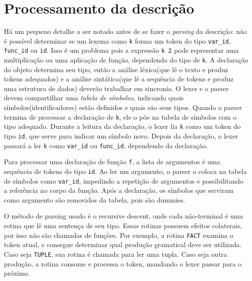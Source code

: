 \documentclass[10pt,a4paper,final]{article}
\begin{document}
\section{Processamento da descrição}
Há um pequeno detalhe a ser notado antes de se fazer o \textit{parsing} da descrição: não é possível determinar se um lexema como \texttt{k} forma um token do tipo \texttt{var\_id}, \texttt{func\_id} ou \texttt{id}. Isso é um problema pois a expressão \texttt{k 2} pode representar uma multiplicação ou uma aplicação de função, dependendo do tipo de \texttt{k}. A declaração do objeto determina seu tipo, então a análise léxica(que lê o texto e produz tokens adequados) e a análise sintática(que lê a sequência de tokens e produz uma estrutura de dados) deverão trabalhar em sincronia. O lexer e o parser devem compartilhar uma \textit{tabela de símbolos}, indicando quais símbolos(identificadores) estão definidos e quais são seus tipos. Quando o parser termina de processar a declaração de \texttt{k}, ele o põe na tabela de símbolos com o tipo adequado. Durante a leitura da declaração, o lexer lia \texttt{k} como um token do tipo \texttt{id}, que serve para indicar um símbolo novo. Depois da declaração, o lexer passará a ler \texttt{k} como \texttt{var\_id} ou \texttt{func\_id}, dependendo da declaração.

Para processar uma declaração de função \texttt{f}, a lista de argumentos é uma sequência de tokens do tipo \texttt{id}. Ao ler um argumento, o parser o coloca na tabela de símbolos como \texttt{var\_id}, impedindo a repetição de argumentos e possibilitando a referência no corpo da função. Após a declaração, os símbolos que serviram como argumento são removidos da tabela, pois são dummies.

O método de parsing usado é o recursive descent, onde cada não-terminal é uma rotina que lê uma sentença de seu tipo. Essas rotinas possuem efeitos colaterais, por isso não são chamadas de funções. Por exemplo, a rotina \texttt{FACT} examina o token atual, e consegue determinar qual produção gramatical deve ser utilizada. Caso seja \texttt{TUPLE}, sua rotina é chamada para ler uma tupla. Caso seja outra produção, a rotina consome e processa o token, mandando o lexer passar para o próximo.
\end{document}
